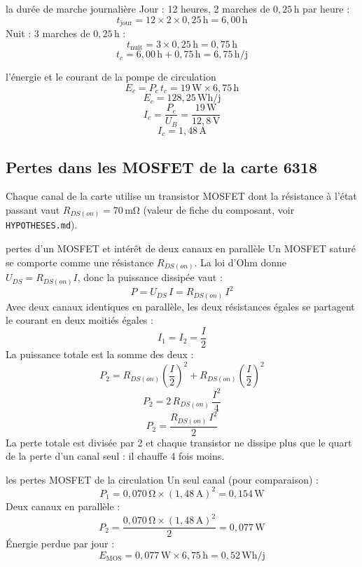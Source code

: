 \documentclass[11pt,a4paper]{article}
\newcommand{\U}[1]{\,\mathrm{#1}}
\begin{document}
\begin{calcul}{la durée de marche journalière}
Jour : 12 heures, 2 marches de $0{,}25\U{h}$ par heure :
\[
t_{\text{jour}} = 12 \times 2 \times 0{,}25\U{h} = 6{,}00\U{h}
\]
Nuit : 3 marches de $0{,}25\U{h}$ :
\[
t_{\text{nuit}} = 3 \times 0{,}25\U{h} = 0{,}75\U{h}
\]
\[
t_c = 6{,}00\U{h} + 0{,}75\U{h} = 6{,}75\U{h/j}
\]
\end{calcul}

\begin{calcul}{l'énergie et le courant de la pompe de circulation}
\[
E_c = P_c \, t_c = 19\U{W} \times 6{,}75\U{h}
\]
\[
E_c = 128{,}25\U{Wh/j}
\]
\[
I_c = \frac{P_c}{U_B} = \frac{19\U{W}}{12{,}8\U{V}}
\]
\[
I_c = 1{,}48\U{A}
\]
\end{calcul}

\subsection{Pertes dans les MOSFET de la carte 6318}

Chaque canal de la carte utilise un transistor MOSFET dont la résistance à l'état passant vaut $R_{DS(on)} = 70\U{m\Omega}$ (valeur de fiche du composant, voir \texttt{HYPOTHESES.md}).

\begin{demo}{pertes d'un MOSFET et intérêt de deux canaux en parallèle}
Un MOSFET saturé se comporte comme une résistance $R_{DS(on)}$. La loi d'Ohm donne $U_{DS} = R_{DS(on)} I$, donc la puissance dissipée vaut :
\[
P = U_{DS} \, I = R_{DS(on)} \, I^2
\]
Avec deux canaux identiques en parallèle, les deux résistances égales se partagent le courant en deux moitiés égales :
\[
I_1 = I_2 = \frac{I}{2}
\]
La puissance totale est la somme des deux :
\[
P_{2} = R_{DS(on)} \left(\frac{I}{2}\right)^2 + R_{DS(on)} \left(\frac{I}{2}\right)^2
\]
\[
P_{2} = 2 \, R_{DS(on)} \, \frac{I^2}{4}
\]
\[
P_{2} = \frac{R_{DS(on)} \, I^2}{2}
\]
La perte totale est divisée par 2 et chaque transistor ne dissipe plus que le quart de la perte d'un canal seul : il chauffe 4 fois moins.
\end{demo}

\begin{calcul}{les pertes MOSFET de la circulation}
Un seul canal (pour comparaison) :
\[
P_1 = 0{,}070\U{\Omega} \times (1{,}48\U{A})^2 = 0{,}154\U{W}
\]
Deux canaux en parallèle :
\[
P_2 = \frac{0{,}070\U{\Omega} \times (1{,}48\U{A})^2}{2} = 0{,}077\U{W}
\]
Énergie perdue par jour :
\[
E_{\text{MOS}} = 0{,}077\U{W} \times 6{,}75\U{h} = 0{,}52\U{Wh/j}
\]
\end{calcul}
\end{document}
